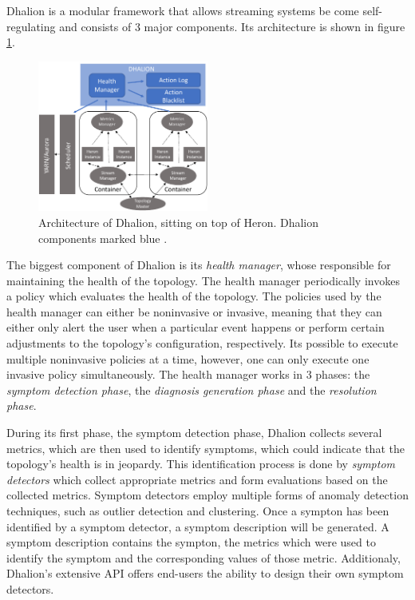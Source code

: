         \label{sub:dhalion-architecture}
        Dhalion is a modular framework that allows streaming systems be come self-regulating and consists of 3 major components.
        Its architecture is shown in figure \ref{fig:dhalion}.

        \begin{figure}[hbt]
            \centering
            \includegraphics[width=0.5\textwidth]{Bilder/dhalion.png}
            \caption{
                Architecture of Dhalion, sitting on top of Heron. Dhalion components marked blue \cite{dhalion}.
            }
            \label{fig:dhalion}
        \end{figure}

        \quad The biggest component of Dhalion is its \textit{health manager}, whose responsible for maintaining the health of the topology.
        The health manager periodically invokes a policy which evaluates the health of the topology. 
        The policies used by the health manager can either be noninvasive or invasive, meaning that they can either only alert the user when a particular event happens or 
        perform certain adjustments to the topology's configuration, respectively.
        Its possible to execute multiple noninvasive policies at a time, however, one can only execute one invasive policy simultaneously.
        The health manager works in 3 phases: the \textit{symptom detection phase}, the \textit{diagnosis generation phase} and the \textit{resolution phase}.
        
        \quad During its first phase, the symptom detection phase, Dhalion collects several metrics, which are then used to identify symptoms, which could indicate that the 
        topology's health is in jeopardy.
        This identification process is done by \textit{symptom detectors} which collect appropriate metrics and form evaluations based on the collected metrics.
        Symptom detectors employ multiple forms of anomaly detection techniques, such as outlier detection and clustering.
        Once a sympton has been identified by a symptom detector, a symptom description will be generated. A symptom description contains the sympton, the metrics which
        were used to identify the symptom and the corresponding values of those metric.
        Additionaly, Dhalion's extensive API offers end-users the ability to design their own symptom detectors.
        
